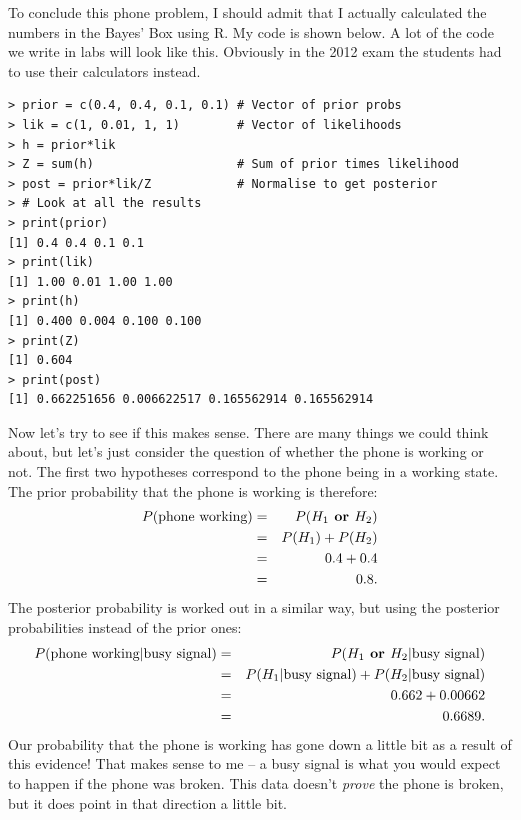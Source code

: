 To conclude this phone problem, I should admit that
I actually calculated the numbers in the Bayes' Box using R. My code is shown
below. A lot of the code we write in labs will look like this. Obviously in the
2012 exam the students had to use their calculators instead.
\begin{framed}
\begin{verbatim}
> prior = c(0.4, 0.4, 0.1, 0.1) # Vector of prior probs
> lik = c(1, 0.01, 1, 1)        # Vector of likelihoods
> h = prior*lik
> Z = sum(h)                    # Sum of prior times likelihood
> post = prior*lik/Z            # Normalise to get posterior
> # Look at all the results
> print(prior)
[1] 0.4 0.4 0.1 0.1
> print(lik)
[1] 1.00 0.01 1.00 1.00
> print(h)
[1] 0.400 0.004 0.100 0.100
> print(Z)
[1] 0.604
> print(post)
[1] 0.662251656 0.006622517 0.165562914 0.165562914
\end{verbatim}
\end{framed}
Now let's try to see if this makes sense. There are many things we could think
about, but let's just consider the question of whether
the phone is working or not. The first two hypotheses correspond to the phone
being in a working state. The prior probability that the phone is working is
therefore:
\begin{eqnarray}
P(\textnormal{phone working}) &=& P(H_1 \textbf{ or } H_2)\\
&=& P(H_1) + P(H_2)\\
&=& 0.4 + 0.4\\
&=& 0.8.
\end{eqnarray}
The posterior probability is worked out in a similar way, but using the posterior
probabilities instead of the prior ones:
\begin{eqnarray}
P(\textnormal{phone working}|\textnormal{busy signal}) &=& P(H_1 \textbf{ or } H_2 | \textnormal{busy signal})\\
&=& P(H_1|\textnormal{busy signal}) + P(H_2|\textnormal{busy signal})\\
&=& 0.662 + 0.00662\\
&=& 0.6689.
\end{eqnarray}
Our probability that the phone is working has gone down a little bit as a result of this
evidence! That makes sense to me -- a busy signal is what you would expect to
happen if the phone was broken. This data doesn't {\it prove} the phone is
broken, but it does point in that direction a little bit.

